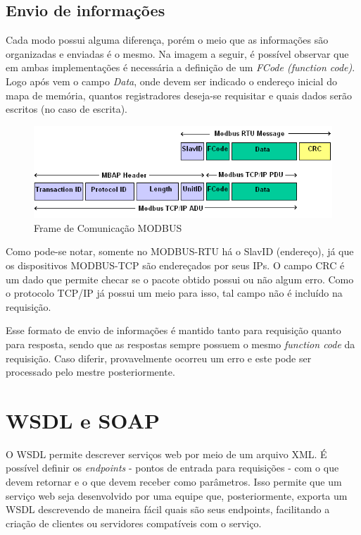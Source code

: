     \subsection{Envio de informações}

      Cada modo possui alguma diferença, porém o meio que as informações são organizadas e enviadas é o mesmo. Na imagem a seguir, é possível observar que em ambas implementações é necessária a definição de um \textit{FCode (function code)}. Logo após vem o campo \textit{Data}, onde devem ser indicado o endereço inicial do mapa de memória, quantos registradores deseja-se requisitar e quais dados serão escritos (no caso de escrita).

      \begin{figure}[H]
        \begin{center}
          \includegraphics[width=\textwidth,natwidth=585,natheight=180]{assets/images/modbus-frame.png}
          \caption{Frame de Comunicação MODBUS}
          \label{fig:modbus-frame}
        \end{center}
      \end{figure}

      Como pode-se notar, somente no MODBUS-RTU há o SlavID (endereço), já que os dispositivos MODBUS-TCP são endereçados por seus IPs. O campo CRC é um dado que permite checar se o pacote obtido possui ou não algum erro. Como o protocolo TCP/IP já possui um meio para isso, tal campo não é incluído na requisição.

      Esse formato de envio de informações é mantido tanto para requisição quanto para resposta, sendo que as respostas sempre possuem o mesmo \textit{function code} da requisição. Caso diferir, provavelmente ocorreu um erro e este pode ser processado pelo mestre posteriormente.

  \section{WSDL e SOAP}

    O WSDL \cite{w3c-spec-wsdl} permite descrever serviços web por meio de um arquivo \ac{XML}. É possível definir os \textit{endpoints} - pontos de entrada para requisições - com o que devem retornar e o que devem receber como parâmetros. Isso permite que um serviço web seja desenvolvido por uma equipe que, posteriormente, exporta um WSDL descrevendo de maneira fácil quais são seus endpoints, facilitando a criação de clientes ou servidores compatíveis com o serviço.

